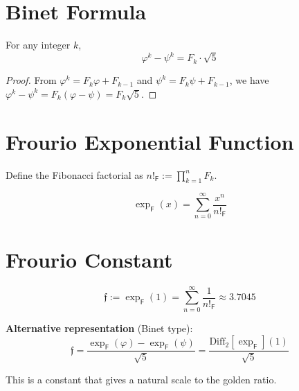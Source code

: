 \section{Binet Formula}
\label{sec:binet}

\begin{theorem}
\label{thm:binet}
\leanok
For any integer $k$,
\[
\varphi^k - \psi^k = F_k \cdot \sqrt{5}
\]
\end{theorem}

\begin{proof}
From $\varphi^k = F_k\varphi + F_{k-1}$ and $\psi^k = F_k\psi + F_{k-1}$, we have
$\varphi^k - \psi^k = F_k(\varphi - \psi) = F_k \sqrt{5}$.
\end{proof}

\section{Frourio Exponential Function}
\label{sec:frourio_exp}

\begin{definition}
\label{def:fib_factorial}
Define the Fibonacci factorial as $n!_{\mathsf{F}} := \prod_{k=1}^{n} F_k$.
\end{definition}

\begin{definition}
\label{def:frourio_exp}
\[
\exp_{\mathsf{F}}(x) = \sum_{n=0}^{\infty} \frac{x^n}{n!_{\mathsf{F}}}
\]
\end{definition}

\section{Frourio Constant}
\label{sec:frourio_constant}

\begin{definition}
\label{def:frourio_constant}
\[
\mathfrak{f} := \exp_{\mathsf{F}}(1) = \sum_{n=0}^{\infty} \frac{1}{n!_{\mathsf{F}}} \approx 3.7045
\]
\end{definition}

\textbf{Alternative representation} (Binet type):
\[
\mathfrak{f} = \frac{\exp_{\mathsf{F}}(\varphi) - \exp_{\mathsf{F}}(\psi)}{\sqrt{5}} = \frac{\mathrm{Diff}_2[\exp_{\mathsf{F}}](1)}{\sqrt{5}}
\]

This is a constant that gives a natural scale to the golden ratio.
